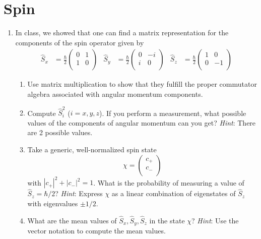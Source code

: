 \documentclass[../psets.tex]{subfiles}
\begin{document}
\section{Spin}
\begin{enumerate}
    \item {}In class, we showed that one can find a matrix representation for the components of the spin operator given by
    \begin{align}
        \hat{S}_x &= \frac{\hbar}{2}
        \begin{pmatrix}
            0 & 1\\
            1 & 0\\
        \end{pmatrix}&
        \hat{S}_y &= \frac{\hbar}{2}
        \begin{pmatrix}
            0 & -i\\
            i & 0\\
        \end{pmatrix}&
        \hat{S}_z &= \frac{\hbar}{2}
        \begin{pmatrix}
            1 & 0\\
            0 & -1\\
        \end{pmatrix}
    \end{align}
    \begin{enumerate}
        \item Use matrix multiplication to show that they fulfill the proper commutator algebra associated with angular momentum components.
        \item Compute $\hat{S}_i^2$ ($i=x,y,z$). If you perform a measurement, what possible values of the components of angular momentum can you get? \emph{Hint}: There are 2 possible values.
        \item Take a generic, well-normalized spin state
        \begin{equation}
            \chi =
            \begin{pmatrix}
                c_+\\
                c_-\\
            \end{pmatrix}
        \end{equation}
        with $|c_+|^2+|c_-|^2=1$. What is the probability of measuring a value of $\hat{S}_z=\hbar/2$? \emph{Hint}: Express $\chi$ as a linear combination of eigenstates of $\hat{S}_z$ with eigenvalues $\pm 1/2$.
        \item What are the mean values of $\hat{S}_x,\hat{S}_y,\hat{S}_z$ in the state $\chi$? \emph{Hint}: Use the vector notation to compute the mean values.

\end{enumerate}
\end{enumerate}
\end{document}
